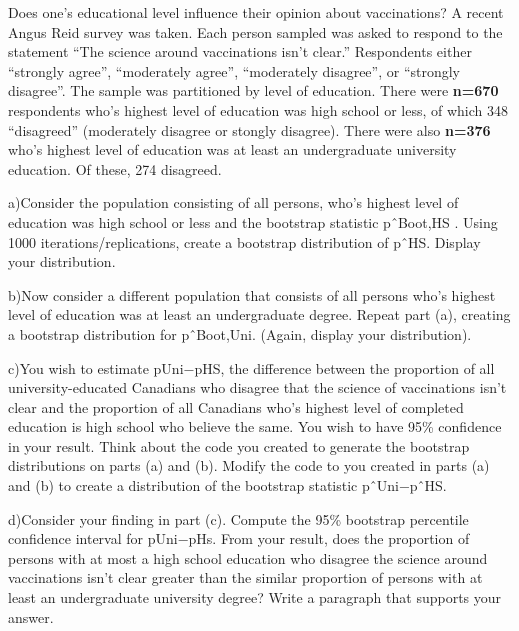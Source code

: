 \documentclass[
]{article}
\begin{document}
Does one's educational level influence their opinion about vaccinations?
A recent Angus Reid survey was taken. Each person sampled was asked to
respond to the statement ``The science around vaccinations isn't
clear.'' Respondents either ``strongly agree'', ``moderately agree'',
``moderately disagree'', or ``strongly disagree''. The sample was
partitioned by level of education. There were \textbf{n=670} respondents
who's highest level of education was high school or less, of which 348
``disagreed'' (moderately disagree or stongly disagree). There were also
\textbf{n=376} who's highest level of education was at least an
undergraduate university education. Of these, 274 disagreed.

a)Consider the population consisting of all persons, who's highest level
of education was high school or less and the bootstrap statistic
pˆBoot,HS . Using 1000 iterations/replications, create a bootstrap
distribution of pˆHS. Display your distribution.

b)Now consider a different population that consists of all persons who's
highest level of education was at least an undergraduate degree. Repeat
part (a), creating a bootstrap distribution for pˆBoot,Uni. (Again,
display your distribution).

c)You wish to estimate pUni−pHS, the difference between the proportion
of all university-educated Canadians who disagree that the science of
vaccinations isn't clear and the proportion of all Canadians who's
highest level of completed education is high school who believe the
same. You wish to have 95\% confidence in your result. Think about the
code you created to generate the bootstrap distributions on parts (a)
and (b). Modify the code to you created in parts (a) and (b) to create a
distribution of the bootstrap statistic pˆUni−pˆHS.

d)Consider your finding in part (c). Compute the 95\% bootstrap
percentile confidence interval for pUni−pHs. From your result, does the
proportion of persons with at most a high school education who disagree
the science around vaccinations isn't clear greater than the similar
proportion of persons with at least an undergraduate university degree?
Write a paragraph that supports your answer.
\end{document}
